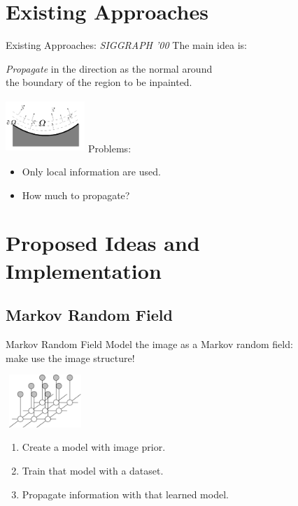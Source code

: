 \documentclass{beamer}
\begin{document}
\section{Existing Approaches}
\begin{frame}{Existing Approaches: \emph{SIGGRAPH '00}}
The main idea is:
\begin{center}
\hspace*{-2cm}
\emph{Propagate} in the direction as the normal around \\\hspace*{-2cm}the boundary of the region to be inpainted.
\end{center}
\vspace*{-2cm}
\hspace*{8.5cm}
\includegraphics[height=2cm, width=3cm]{prop.png}
\vspace*{1cm}
Problems:
\begin{itemize}
\item Only local information are used.
\item How much to propagate?
\end{itemize}

\end{frame}



\section{Proposed Ideas and Implementation}
\subsection{Markov Random Field}
\begin{frame}{Markov Random Field}
Model the image as a Markov random field:\\
\quad make use the image structure!


\hspace*{8cm}
\includegraphics[height=2cm, width=3cm]{mrf.jpg}

\vspace*{-1cm}
\begin{enumerate}
\item Create a model with image prior.
\item Train that model with a dataset.
\item Propagate information with that learned model.
\end{enumerate}
\end{frame}
\end{document}
